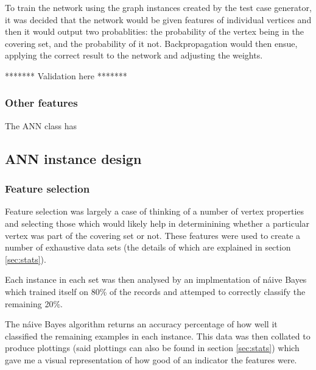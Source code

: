 \documentclass[11pt]{article}
\theoremstyle{definition}
\begin{document}
        To train the network using the graph instances created by the test case generator, it was
        decided that the network would be given features of individual vertices and then it would output
        two probablities: the probability of the vertex being in the covering set, and the probability of it not.
        Backpropagation would then ensue, applying the correct result to the network and adjusting the weights.          

        ******* Validation here *******

        \subsubsection{Other features}
          The ANN class has 

     \subsection{ANN instance design}

       \subsubsection{Feature selection}
         Feature selection was largely a case of thinking of a number of vertex properties and selecting those which
         would likely help in determinining whether a particular vertex was part of the covering set or not. These
         features were used to create a number of exhaustive data sets (the details of which are explained in
          section \ref{sec:stats}).

         Each instance in each set was then analysed by an implmentation of n\'{a}ive Bayes which trained itself on 80\%
         of the records and attemped to correctly classify the remaining 20\%.
  
         The n\'{a}ive Bayes algorithm returns an accuracy percentage of how well it classified the remaining examples
         in each instance. This data was then collated to produce plottings (said plottings can also be found in
         section \ref{sec:stats}) which gave me a visual representation of how good of an indicator the features
         were.
\end{document}
